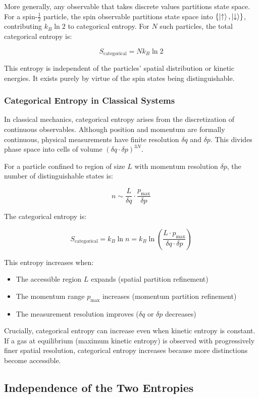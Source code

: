 \documentclass[twocolumn,10pt]{article}
\theoremstyle{definition}
\theoremstyle{remark}
\begin{document}
More generally, any observable that takes discrete values partitions state space. For a spin-$\frac{1}{2}$ particle, the spin observable partitions state space into $\{ \ket{\uparrow}, \ket{\downarrow}\}$, contributing $k_B \ln 2$ to categorical entropy. For $N$ such particles, the total categorical entropy is:

$$
S_{\text{categorical}} = N k_B \ln 2
$$

This entropy is independent of the particles' spatial distribution or kinetic energies. It exists purely by virtue of the spin states being distinguishable.

\subsubsection{Categorical Entropy in Classical Systems}

In classical mechanics, categorical entropy arises from the discretization of continuous observables. Although position and momentum are formally continuous, physical measurements have finite resolution $\delta q$ and $\delta p$. This divides phase space into cells of volume $(\delta q \cdot \delta p)^{3N}$.

For a particle confined to region of size $L$ with momentum resolution $\delta p$, the number of distinguishable states is:

$$
n \sim \frac{L}{\delta q} \cdot \frac{p_{\text{max}}}{\delta p}
$$

The categorical entropy is:

$$
S_{\text{categorical}} = k_B \ln n = k_B \ln\left(\frac{L \cdot p_{\text{max}}}{\delta q \cdot \delta p}\right)
$$

This entropy increases when:
\begin{itemize}
\item The accessible region $L$ expands (spatial partition refinement)
\item The momentum range $p_{\text{max}}$ increases (momentum partition refinement)
\item The measurement resolution improves ($\delta q$ or $\delta p$ decreases)
\end{itemize}

Crucially, categorical entropy can increase even when kinetic entropy is constant. If a gas at equilibrium (maximum kinetic entropy) is observed with progressively finer spatial resolution, categorical entropy increases because more distinctions become accessible.

\subsection{Independence of the Two Entropies}
\end{document}
